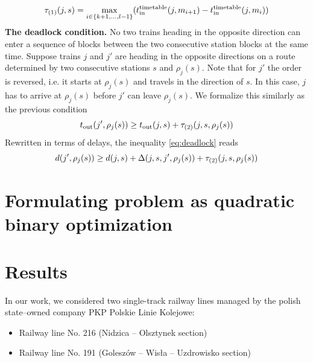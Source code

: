 \begin{equation}
	\tau_{(1)}(j, s) = \max_{i \in \{k+1,\ldots,l-1\}}(t_\text{in}^\text{timetable}(j, m_{i+1}) - t_\text{in}^\text{timetable}(j, m_i))
\end{equation}
\textbf{The deadlock condition.} No two trains heading in the opposite direction can enter
a sequence of blocks between the two consecutive station blocks at the same time. Suppose trains $j$
and $j'$ are heading in the opposite directions on a route determined by two consecutive stations
$s$ and $\rho_j(s)$. Note that for $j'$ the order is reversed, i.e. it starts at $\rho_j(s)$ and
travels in the direction of $s$. In this case, $j$ has to arrive at $\rho_j(s)$ before $j'$ can
leave $\rho_j(s)$. We formalize this similarly as the previous condition
\begin{equation}
	\label{eq:deadlock}
	t_\text{out}(j', \rho_j(s)) \ge t_\text{out}(j,s) + \tau_{(2)}(j, s, \rho_j(s))
\end{equation}
Rewritten in terms of delays, the inequality \eqref{eq:deadlock} reads
\begin{equation}
	d(j',\rho_j(s)) \ge d(j, s) + \Delta(j,s,j',\rho_j(s)) + \tau_{(2)}(j, s, \rho_j(s))
\end{equation}
\section{Formulating problem as quadratic binary optimization}


\section{Results}
In our work, we considered two single-track railway lines managed by the polish state--owned company
PKP Polskie Linie Kolejowe:

\begin{itemize}
	\item Railway line No. 216 (Nidzica -- Olsztynek section)
	\item Railway line No. 191 (Goleszów -- Wisła -- Uzdrowisko section)
\end{itemize}

